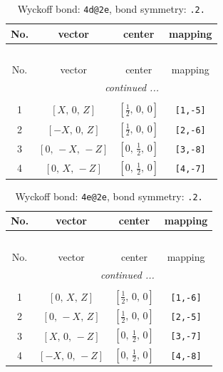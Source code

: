 \documentclass[fleqn,8pt]{jsarticle}
\begin{document}
\begin{longtable}{cccc}
\caption{Wyckoff bond: {\tt 4d@2e}, bond symmetry: {\tt .2.}}
 \\
 \hline \hline
No. & vector & center & mapping \\ \hline \endfirsthead

\multicolumn{3}{l}{\tablename\ \thetable{}} \\
 \hline \hline
No. & vector & center & mapping \\ \hline \endhead

 \hline \hline
\multicolumn{3}{r}{\footnotesize\it continued ...} \\ \endfoot

 \hline \hline
\multicolumn{3}{r}{} \\ \endlastfoot

1 & $\left[ X,\, 0,\, Z \right]$ & $\left[ \frac{1}{2},\, 0,\, 0 \right]$ & {\tt [1,-5]} \\ \hline
2 & $\left[ - X,\, 0,\, Z \right]$ & $\left[ \frac{1}{2},\, 0,\, 0 \right]$ & {\tt [2,-6]} \\ \hline
3 & $\left[ 0,\, - X,\, - Z \right]$ & $\left[ 0,\, \frac{1}{2},\, 0 \right]$ & {\tt [3,-8]} \\ \hline
4 & $\left[ 0,\, X,\, - Z \right]$ & $\left[ 0,\, \frac{1}{2},\, 0 \right]$ & {\tt [4,-7]} \\
\end{longtable}
\renewcommand{\arraystretch}{1.2}
\begin{longtable}{cccc}
\caption{Wyckoff bond: {\tt 4e@2e}, bond symmetry: {\tt .2.}}
 \\
 \hline \hline
No. & vector & center & mapping \\ \hline \endfirsthead

\multicolumn{3}{l}{\tablename\ \thetable{}} \\
 \hline \hline
No. & vector & center & mapping \\ \hline \endhead

 \hline \hline
\multicolumn{3}{r}{\footnotesize\it continued ...} \\ \endfoot

 \hline \hline
\multicolumn{3}{r}{} \\ \endlastfoot

1 & $\left[ 0,\, X,\, Z \right]$ & $\left[ \frac{1}{2},\, 0,\, 0 \right]$ & {\tt [1,-6]} \\ \hline
2 & $\left[ 0,\, - X,\, Z \right]$ & $\left[ \frac{1}{2},\, 0,\, 0 \right]$ & {\tt [2,-5]} \\ \hline
3 & $\left[ X,\, 0,\, - Z \right]$ & $\left[ 0,\, \frac{1}{2},\, 0 \right]$ & {\tt [3,-7]} \\ \hline
4 & $\left[ - X,\, 0,\, - Z \right]$ & $\left[ 0,\, \frac{1}{2},\, 0 \right]$ & {\tt [4,-8]} \\
\end{longtable}
\end{document}
